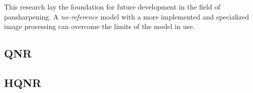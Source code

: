 \documentclass[12pt]{report}
\begin{document}
This research lay the foundation for future development in the field of pansharpening.
A \textit{no-reference} model with a more implemented and specialized image processing can overcome the limits of the model in use.
\newpage




\newpage



\appendix

\begin{spacing}{1}
    \chapter{}
        \section{QNR}
        \label{qnr_functions}
        

        \section{HQNR}
        \label{hqnr_functions}
        
\end{spacing}

\restoregeometry
\end{document}
